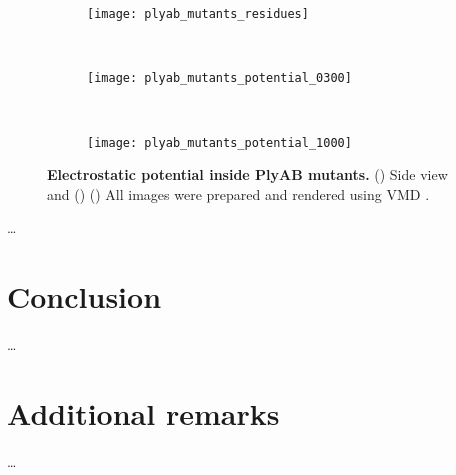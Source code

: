 \begin{figure*}[t]
  \centering
  \medskip

  \begin{subfigure}[t]{120mm}
    \centering
    \caption{}\vspace{-5mm}\hspace{1.5mm}\label{fig:plyab_mutants_residues}
    \texttt{[image: plyab\_mutants\_residues]}
  \end{subfigure}
  \\ \vspace{-2mm}
  \begin{subfigure}[t]{120mm}
    \centering
    \caption{}\vspace{-2.5mm}\hspace{1.5mm}\label{fig:plyab_mutants_potential_0300}
    \texttt{[image: plyab\_mutants\_potential\_0300]}
  \end{subfigure}
  \\ \vspace{0mm}
  \begin{subfigure}[t]{120mm}
    \centering
    \caption{}\vspace{-2.5mm}\hspace{1.5mm}\label{fig:plyab_mutants_potential_2500}
    \texttt{[image: plyab\_mutants\_potential\_1000]}
  \end{subfigure}

\caption[Electrostatic potential inside PlyAB mutants.]{%
  \textbf{Electrostatic potential inside PlyAB mutants.}
  ()
  Side view and
  ()
  ()
  All images were prepared and rendered using VMD \cite{Humphrey-1996,Stone-1998}.
  }\label{fig:plyab_mutants}
\end{figure*}

\ldots
\section{Conclusion}
\ldots

\section{Additional remarks}
\ldots




\cleardoublepage

